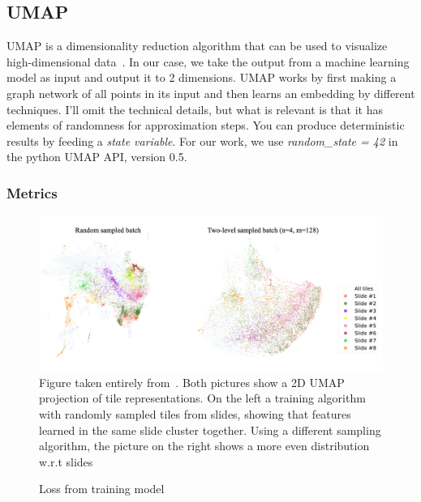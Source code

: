 \documentclass[10pt,twocolumn,letterpaper]{article}
\begin{document}
\subsection{UMAP}
\gls{UMAP} is a dimensionality reduction algorithm that can be used to visualize high-dimensional data~\cite{umap}. In our case, we take the output from a machine learning model as input and output it to 2 dimensions. \gls{UMAP} works by first making a graph network of all points in its input and then learns an embedding by different techniques. I'll omit the technical details, but what is relevant is that it has elements of randomness for approximation steps. You can produce deterministic results by feeding a \textit{state variable}. For our work, we use \textit{random\_state = 42} in the python \gls{UMAP} API, version 0.5.

\subsubsection{Metrics}

\begin{figure}
  \includegraphics[scale=.17]{./umap.png}
  \caption{Figure taken entirely from~\cite{sslUMAP}. Both pictures show a 2D \gls{UMAP} projection of tile representations. On the left a training algorithm with randomly sampled tiles from slides, showing that features learned in the same slide cluster together. Using a different sampling algorithm, the picture on the right shows a more even distribution w.r.t slides}
  \label{fig:umap}
\end{figure}

\begin{figure}\label{fig:loss}
\caption{Loss from training model}
\label{fig:defaultLoss}
\end{figure}
\end{document}
